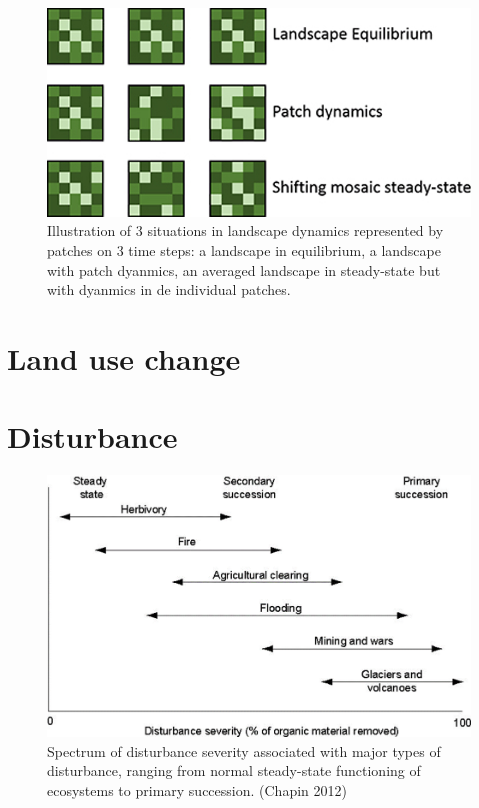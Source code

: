 \documentclass[
  12pt,
  oneside]{book}
\begin{document}
\begin{figure}

{\centering \includegraphics[width=0.8\linewidth]{figures/chap8/f82_patch} 

}

\caption{Illustration of 3 situations in landscape dynamics represented by patches on 3 time steps: a landscape in equilibrium, a landscape with patch dyanmics, an averaged landscape in steady-state but with dyanmics in de individual patches.}\label{fig:f82}
\end{figure}

\hypertarget{land-use-change}{%
\section{Land use change}\label{land-use-change}}

\hypertarget{disturbance}{%
\section{Disturbance}\label{disturbance}}

\begin{figure}

{\centering \includegraphics[width=0.8\linewidth]{figures/chap8/f83_disturbance_chapin} 

}

\caption{Spectrum of disturbance severity associated with major types of disturbance, ranging from normal steady-state functioning of ecosystems to primary succession. (Chapin 2012)}\label{fig:f83}
\end{figure}
\end{document}
